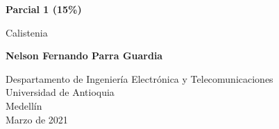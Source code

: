 \documentclass{article}
\begin{document}
\begin{titlepage}
    \begin{center}
        \vspace*{1cm}
            
        \Huge
        \textbf{Parcial 1 (15\%)}
            
        \vspace{0.5cm}
        \LARGE
        Calistenia
            
        \vspace{1.5cm}
            
        \textbf{Nelson Fernando Parra Guardia}
            
        \vfill
            
        \vspace{0.8cm}
            
        \Large
        Despartamento de Ingeniería Electrónica y Telecomunicaciones\\
        Universidad de Antioquia\\
        Medellín\\
        Marzo de 2021
            
    \end{center}
\end{titlepage}

\newpage
\end{document}
